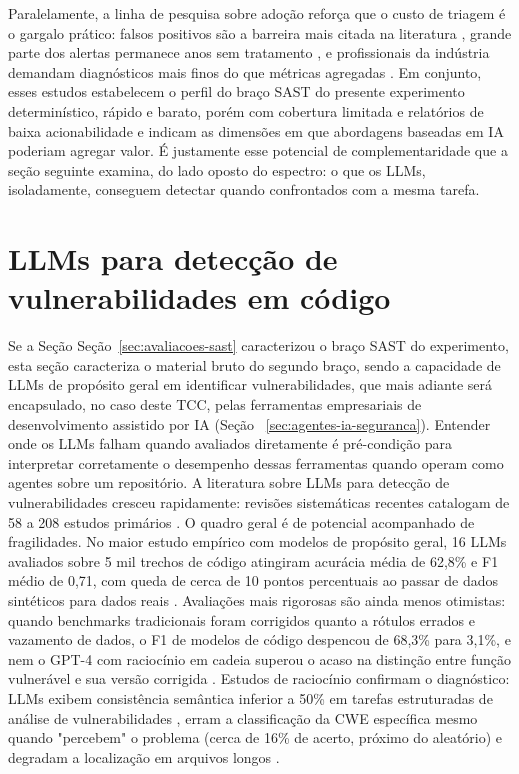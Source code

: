 Paralelamente, a linha de pesquisa sobre adoção reforça que o custo de triagem é o gargalo prático: falsos positivos são a barreira mais citada na literatura \cite{Wadhams2024SASTBarriers}, grande parte dos alertas permanece anos sem tratamento \cite{Aloraini2019SASTWarnings}, e profissionais da indústria demandam diagnósticos mais finos do que métricas agregadas \cite{Li2025IndustrySAST}. Em conjunto, esses estudos estabelecem o perfil do braço SAST do presente experimento determinístico, rápido e barato, porém com cobertura limitada e relatórios de baixa acionabilidade e indicam as dimensões em que abordagens baseadas em IA poderiam agregar valor. É justamente esse potencial de complementaridade que a seção seguinte examina, do lado oposto do espectro: o que os LLMs, isoladamente, conseguem detectar quando confrontados com a mesma tarefa.


\section{LLMs para detecção de vulnerabilidades em código}\label{sec:llms-deteccao-vulnerabilidades}
Se a Seção Seção~\ref{sec:avaliacoes-sast} caracterizou o braço SAST do experimento, esta seção caracteriza o material bruto do segundo braço, sendo a capacidade de LLMs de propósito geral em identificar vulnerabilidades, que mais adiante será encapsulado, no caso deste TCC, pelas ferramentas empresariais de desenvolvimento assistido por IA (Seção ~\ref{sec:agentes-ia-seguranca}). Entender onde os LLMs falham quando avaliados diretamente é pré-condição para interpretar corretamente o desempenho dessas ferramentas quando operam como agentes sobre um repositório. A literatura sobre LLMs para detecção de vulnerabilidades cresceu rapidamente: revisões sistemáticas recentes catalogam de 58 a 208 estudos primários \cite{Sheng2025LLMSurvey, Zhou2025LLMReview, Germano2025LLMSLR}. O quadro geral é de potencial acompanhado de fragilidades. No maior estudo empírico com modelos de propósito geral, 16 LLMs avaliados sobre 5 mil trechos de código atingiram acurácia média de 62,8\% e F1 médio de 0,71, com queda de cerca de 10 pontos percentuais ao passar de dados sintéticos para dados reais \cite{Khare2025LLMEffectiveness}. Avaliações mais rigorosas são ainda menos otimistas: quando benchmarks tradicionais foram corrigidos quanto a rótulos errados e vazamento de dados, o F1 de modelos de código despencou de 68,3\% para 3,1\%, e nem o GPT-4 com raciocínio em cadeia superou o acaso na distinção entre função vulnerável e sua versão corrigida \cite{Ding2025CodeLMVuln}. Estudos de raciocínio confirmam o diagnóstico: LLMs exibem consistência semântica inferior a 50\% em tarefas estruturadas de análise de vulnerabilidades \cite{Li2025SVTrustEval}, erram a classificação da CWE específica mesmo quando "percebem" o problema (cerca de 16\% de acerto, próximo do aleatório) \cite{Gaspar2025OpenLLM, Lin2025LLMCompare} e degradam a localização em arquivos longos \cite{Sovrano2025LostInEnd}.

